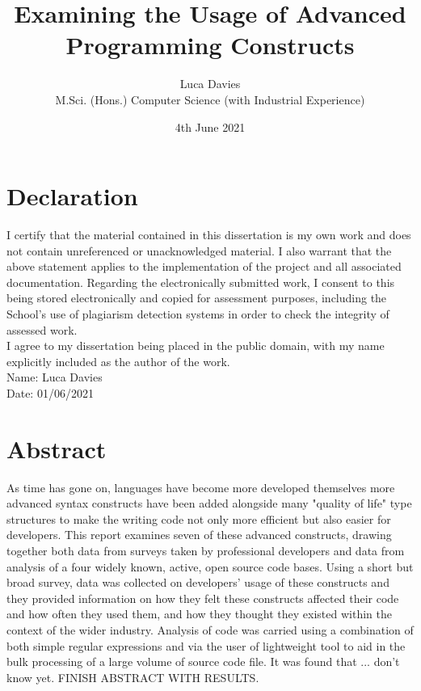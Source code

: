 \documentclass{article}
\title{\textbf{Examining the Usage of Advanced Programming Constructs}}
\author{
Luca Davies \\ M.Sci. (Hons.) Computer Science (with Industrial Experience)}
\date{4th June 2021}
\begin{document}
\maketitle

\newpage
\section*{Declaration}
    I certify that the material contained in this dissertation is my own work and does not contain unreferenced or unacknowledged material. I also warrant that the above statement applies to the implementation of the project and all associated documentation. Regarding the electronically submitted work, I consent to this being stored electronically and copied for assessment purposes, including the School’s use of plagiarism detection systems in order to check the integrity of assessed work. \\
    I agree to my dissertation being placed in the public domain, with my name explicitly included as the author of the work. \\
    
    \noindent
    Name: Luca Davies\\
    Date: 01/06/2021
\newpage
\section*{Abstract}
    As time has gone on, languages have become more developed themselves more advanced syntax constructs have been added alongside many "quality of life" type structures to make the writing code not only more efficient but also easier for developers. This report examines seven of these advanced constructs, drawing together both data from surveys taken by professional developers and data from analysis of a four widely known, active, open source code bases. Using a short but broad survey, data was collected on developers' usage of these constructs and they provided information on how they felt these constructs affected their code and how often they used them, and how they thought they existed within the context of the wider industry. Analysis of code was carried using a combination of both simple regular expressions and via the user of lightweight tool to aid in the bulk processing of a large volume of source code file. It was found that ... don't know yet. FINISH ABSTRACT WITH RESULTS.
    \newline
\newpage
\tableofcontents
\end{document}
